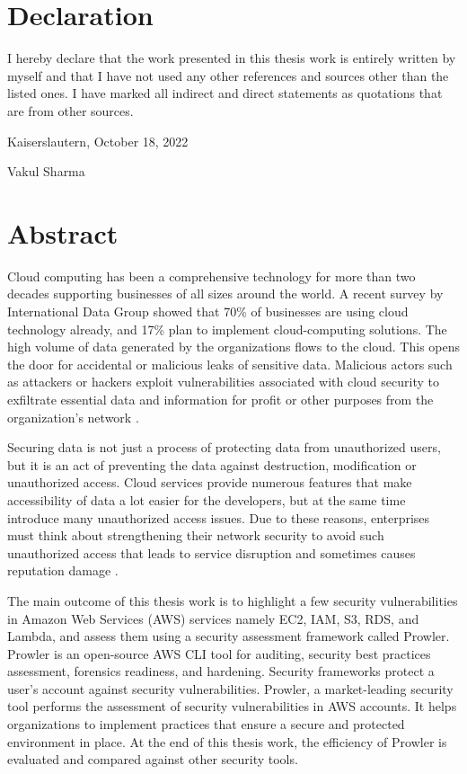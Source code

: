 \documentclass[a4paper,11pt]{report}
\begin{document}

\clearpage
\section*{Declaration}
\text
I hereby declare that the work presented in this thesis work is entirely written by myself and that I have not used any other references and sources other than the listed ones.
I have marked all indirect and direct statements as
quotations that are from other sources.\\

\raggedright{Kaiserslautern, October 18, 2022}\\

\hfill \break
\raggedright{Vakul Sharma}


\cleardoublepage

\section*{Abstract}
\text
Cloud computing has been a comprehensive technology for more
than two decades supporting
businesses of all sizes around the world.
A recent survey by International Data Group showed that 70\%
of businesses are using cloud technology already, and
17\% plan
to implement cloud-computing solutions.
The high volume of data generated by the organizations flows to the cloud.
This opens the door for accidental or malicious leaks of sensitive data.
Malicious actors such as attackers or hackers exploit vulnerabilities associated with cloud security to exfiltrate essential data and information for profit or other purposes from the organization’s network \cite{1}.

\hfill \break

Securing data is not just a process of protecting data
from unauthorized users, but it is an act of preventing
the data against destruction, modification or
unauthorized access.
Cloud services provide numerous features that make accessibility of data a lot easier for the developers, but at the same time introduce many unauthorized access issues.
Due to these reasons, enterprises must think
about strengthening
their network security to avoid such unauthorized access that leads to service disruption and sometimes causes reputation damage \cite{1}.

\hfill \break
The main outcome of this thesis work is to highlight a few security vulnerabilities in Amazon Web Services (AWS) services namely EC2, IAM, S3, RDS, and Lambda, and assess them using a security assessment framework called Prowler.
Prowler is an open-source AWS CLI tool for auditing, security best practices assessment, forensics readiness, and hardening.
Security frameworks protect a user’s account against security vulnerabilities.
Prowler, a market-leading security tool performs the assessment of security vulnerabilities in AWS accounts.
It helps organizations to implement practices that ensure a secure and protected environment in place.
At the end of this thesis work, the efficiency of Prowler is evaluated and compared against other security tools.
\end{document}
